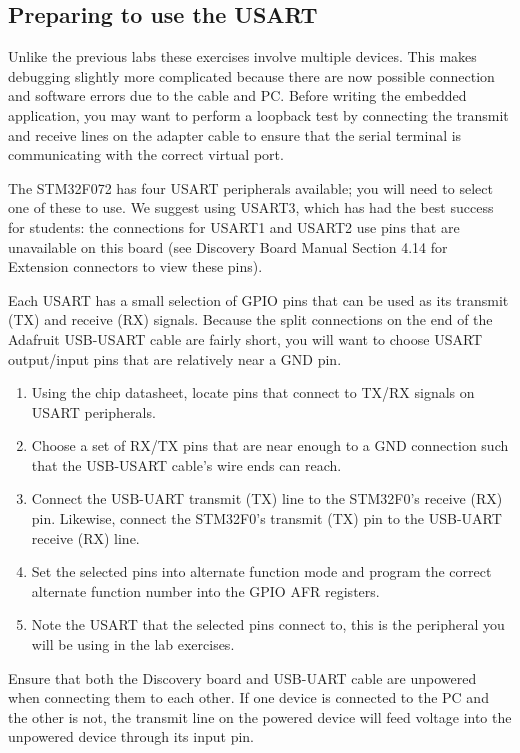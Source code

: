 \documentclass[openany,11pt,fleqn]{book} %
\begin{document}
\subsection{Preparing to use the USART} 
Unlike the previous labs these exercises involve multiple devices. This makes debugging slightly more complicated because there are now possible connection and software errors due to the cable and PC. Before writing the embedded application, you may want to perform a loopback test by connecting the transmit and receive lines on the adapter cable to ensure that the serial terminal is communicating with the correct virtual port. 

\begin{exercise}
	The STM32F072 has four USART peripherals available; you will need to select one of these to use. We suggest using USART3, which has had the best success for students: the connections for USART1 and USART2 use pins that are unavailable on this board (see Discovery Board Manual Section 4.14 for Extension connectors to view these pins).
	
	Each USART has a small selection of GPIO pins that can be used as its transmit (TX) and receive (RX) signals. Because the split connections on the end of the Adafruit USB-USART cable are fairly short, you will want to choose USART output/input pins that are relatively near a GND pin.
	 
	 \begin{enumerate}
	     \item Using the chip datasheet, locate pins that connect to TX/RX signals on USART peripherals.
	     \item Choose a set of RX/TX pins that are near enough to a GND connection such that the USB-USART cable's wire ends can reach. 
	     \item Connect the USB-UART transmit (TX) line to the STM32F0's receive (RX) pin. Likewise, connect the  STM32F0's transmit (TX) pin to the USB-UART receive (RX) line.
	     \item Set the selected pins into alternate function mode and program the correct alternate function number into the GPIO AFR registers. 
	     \item Note the USART that the selected pins connect to, this is the peripheral you will be using in the lab exercises.  
	 \end{enumerate}
\end{exercise}

\begin{warning}
    Ensure that both the Discovery board and USB-UART cable are unpowered when connecting them to each other. If one device is connected to the PC and the other is not, the transmit line on the powered device will feed voltage into the unpowered device through its input pin. 
\end{warning}
\end{document}
